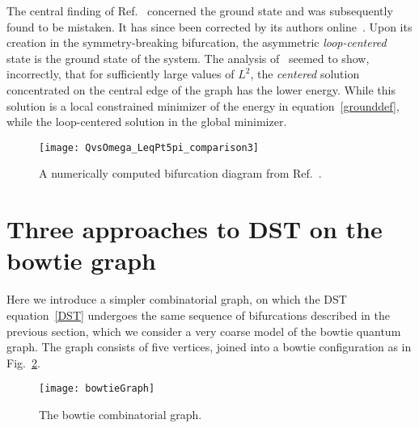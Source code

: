 \documentclass{article}
\numberwithin{equation}{section}
\numberwithin{figure}{section}
\begin{document}
 The central finding of Ref.~\cite{Marzuola:2016bl} concerned the ground state and was subsequently found to be mistaken. It has since been corrected by its authors online~\cite{Marzuola:2017}. Upon its creation in the symmetry-breaking bifurcation, the asymmetric \emph{loop-centered} state is the ground state of the system. The analysis of~\cite{Marzuola:2016bl} seemed to show, incorrectly, that for sufficiently large values of $L^2$, the \emph{centered} solution concentrated on the central edge of the graph has the lower energy. While this solution is a local constrained minimizer of the energy in equation~\eqref{grounddef}, while the loop-centered solution in the global minimizer.
 
\begin{figure}[htbp] %
   \centering
   \texttt{[image: QvsOmega\_LeqPt5pi\_comparison3]} 
   \caption{A numerically computed bifurcation diagram from Ref.~\cite{Marzuola:2016bl}. }
\label{fig:Old}
\end{figure}


\section{Three approaches to DST on the bowtie  graph}
\label{sec:bowtie}
Here we introduce a simpler combinatorial graph, on which the DST equation~\eqref{DST} undergoes the same sequence of bifurcations described in the previous section, which we consider a very coarse model of the bowtie quantum graph. The graph consists of five vertices, joined into a bowtie configuration as in Fig.~\ref{fig:bowtie}. 



\begin{figure}[htbp] %
   \centering
   \texttt{[image: bowtieGraph]} 
   \caption{The bowtie combinatorial graph.}
\label{fig:bowtie}
\end{figure}
\end{document}

